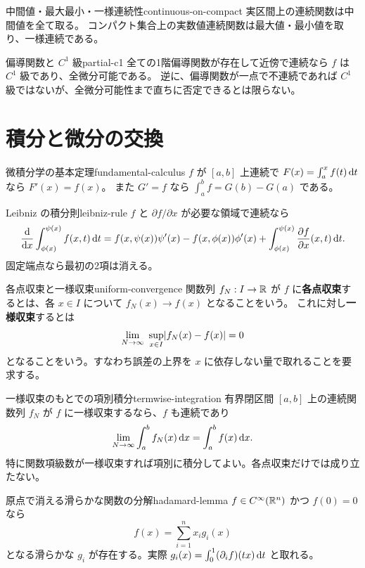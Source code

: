 \begin{theorem}{中間値・最大最小・一様連続性}{continuous-on-compact}
実区間上の連続関数は中間値を全て取る。
コンパクト集合上の実数値連続関数は最大値・最小値を取り、一様連続である。
\end{theorem}

\begin{proposition}{偏導関数と $C^1$ 級}{partial-c1}
全ての1階偏導関数が存在して近傍で連続なら $f$ は $C^1$ 級であり、全微分可能である。
逆に、偏導関数が一点で不連続であれば $C^1$ 級ではないが、全微分可能性まで直ちに否定できるとは限らない。
\end{proposition}

\section{積分と微分の交換}

\begin{theorem}{微積分学の基本定理}{fundamental-calculus}
$f$ が $[a,b]$ 上連続で $F(x)=\int_a^x f(t)\,\mathrm{d} t$ なら $F'(x)=f(x)$。
また $G'=f$ なら $\int_a^b f=G(b)-G(a)$ である。
\end{theorem}

\begin{theorem}{Leibniz の積分則}{leibniz-rule}
$f$ と $\partial f/\partial x$ が必要な領域で連続なら
\[
\frac{\mathrm{d}}{\mathrm{d} x}\int_{\phi(x)}^{\psi(x)}f(x,t)\,\mathrm{d} t
=f(x,\psi(x))\psi'(x)-f(x,\phi(x))\phi'(x)
+\int_{\phi(x)}^{\psi(x)}\frac{\partial f}{\partial x}(x,t)\,\mathrm{d} t.
\]
固定端点なら最初の2項は消える。
\end{theorem}

\begin{definition}{各点収束と一様収束}{uniform-convergence}
関数列 $f_N:I\to\mathbb{R}$ が $f$ に\textbf{各点収束}するとは、各 $x\in I$ について
$f_N(x)\to f(x)$ となることをいう。
これに対し\textbf{一様収束}するとは
\[
\lim_{N\to\infty}\ \sup_{x\in I}\lvert f_N(x)-f(x) \rvert=0
\]
となることをいう。すなわち誤差の上界を $x$ に依存しない量で取れることを要求する。
\end{definition}

\begin{theorem}{一様収束のもとでの項別積分}{termwise-integration}
有界閉区間 $[a,b]$ 上の連続関数列 $f_N$ が $f$ に一様収束するなら、$f$ も連続であり
\[
\lim_{N\to\infty}\int_a^bf_N(x)\,\mathrm{d} x=\int_a^bf(x)\,\mathrm{d} x.
\]
特に関数項級数が一様収束すれば項別に積分してよい。各点収束だけでは成り立たない。
\end{theorem}

\begin{proposition}{原点で消える滑らかな関数の分解}{hadamard-lemma}
$f\in C^\infty(\mathbb{R}^n)$ かつ $f(0)=0$ なら
\[
  f(x)=\sum_{i=1}^n x_i g_i(x)
\]
となる滑らかな $g_i$ が存在する。実際
$g_i(x)=\int_0^1(\partial_i f)(tx)\,\mathrm{d} t$ と取れる。
\end{proposition}

